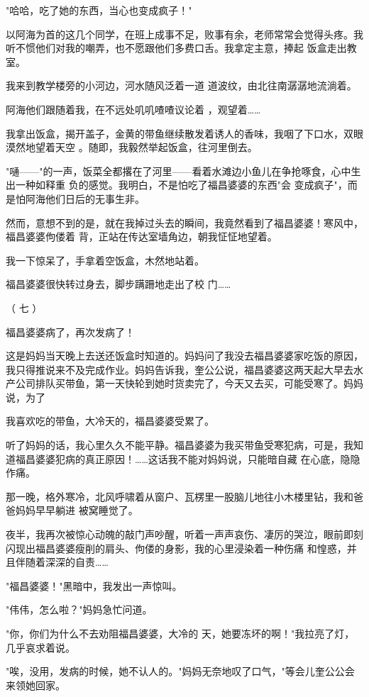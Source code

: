 \documentclass{article}
\begin{document}
"哈哈，吃了她的东西，当心也变成疯子！"


以阿海为首的这几个同学，在班上成事不足，败事有余，老师常常会觉得头疼。我听不惯他们对我的嘲弄，也不愿跟他们多费口舌。我拿定主意，捧起
饭盒走出教室。 

我来到教学楼旁的小河边，河水随风泛着一道
道波纹，由北往南潺潺地流淌着。 

阿海他们跟随着我，在不远处叽叽喳喳议论着
，观望着…… 

我拿出饭盒，揭开盖子，金黄的带鱼继续散发着诱人的香味，我咽了下口水，双眼漠然地望着天空
。随即，我毅然举起饭盒，往河里倒去。 

"嗵——"的一声，饭菜全都撂在了河里——看着水滩边小鱼儿在争抢啄食，心中生出一种如释重
\newpage
负的感觉。我明白，不是怕吃了福昌婆婆的东西"会
变成疯子"，而是怕阿海他们日后的无事生非。 

然而，意想不到的是，就在我掉过头去的瞬间，我竟然看到了福昌婆婆！寒风中，福昌婆婆佝偻着
背，正站在传达室墙角边，朝我怔怔地望着。 

我一下惊呆了，手拿着空饭盒，木然地站着。

福昌婆婆很快转过身去，脚步蹒跚地走出了校
门…… 


（ 七 ） 


福昌婆婆病了，再次发病了！ 

这是妈妈当天晚上去送还饭盒时知道的。妈妈问了我没去福昌婆婆家吃饭的原因，我只得推说来不及完成作业。妈妈告诉我，奎公公说，福昌婆婆这两天起大早去水产公司排队买带鱼，第一天快轮到她时货卖完了，今天又去买，可能受寒了。妈妈说，为了
\newpage

我喜欢吃的带鱼，大冷天的，福昌婆婆受累了。 

听了妈妈的话，我心里久久不能平静。福昌婆婆为我买带鱼受寒犯病，可是，我知道福昌婆婆犯病的真正原因！……这话我不能对妈妈说，只能暗自藏
在心底，隐隐作痛。 

那一晚，格外寒冷，北风呼啸着从窗户、瓦楞里一股脑儿地往小木楼里钻，我和爸爸妈妈早早躺进
被窝睡觉了。 

夜半，我再次被惊心动魄的敲门声吵醒，听着一声声哀伤、凄厉的哭泣，眼前即刻闪现出福昌婆婆瘦削的肩头、佝偻的身影，我的心里浸染着一种伤痛
和惶惑，并且伴随着深深的自责…… 


"福昌婆婆！"黑暗中，我发出一声惊叫。 


"伟伟，怎么啦？"妈妈急忙问道。 

"你，你们为什么不去劝阻福昌婆婆，大冷的
\newpage
天，她要冻坏的啊！"我拉亮了灯，几乎哀求着说。

"唉，没用，发病的时候，她不认人的。"妈妈无奈地叹了口气，"等会儿奎公公会来领她回家。
\end{document}
